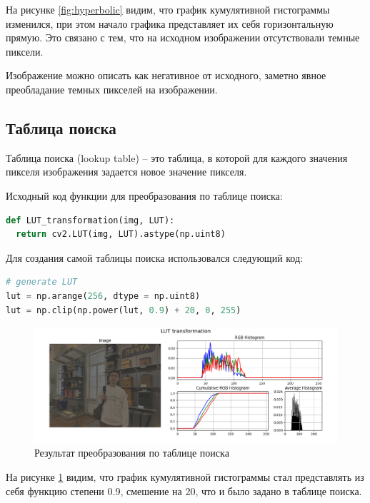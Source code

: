 На рисунке \ref{fig:hyperbolic} видим, что график кумулятивной гистограммы изменился, при этом начало графика представляет их себя горизонтальную
прямую. Это связано с тем, что на исходном изображении отсутствовали темные пиксели. 

Изображение можно описать как негативное от исходного, заметно явное преобладание темных пикселей на изображении.

\subsection{Таблица поиска}

Таблица поиска (lookup table) -- это таблица, в которой для каждого значения пикселя изображения задается новое значение пикселя.

Исходный код функции для преобразования по таблице поиска:

\begin{lstlisting}[language=Python]
def LUT_transformation(img, LUT):
  return cv2.LUT(img, LUT).astype(np.uint8)
\end{lstlisting}

Для создания самой таблицы поиска использовался следующий код:  

\begin{lstlisting}[language=Python]
# generate LUT 
lut = np.arange(256, dtype = np.uint8)
lut = np.clip(np.power(lut, 0.9) + 20, 0, 255)
\end{lstlisting}

\begin{figure}[H]
    \centering
    \includegraphics[width=\textwidth]{../results/LUT transformation.png}
    \caption{Результат преобразования по таблице поиска}
    \label{fig:lut}
\end{figure}

На рисунке \ref{fig:lut} видим, что график кумулятивной гистограммы стал представлять из себя функцию степени 0.9, смешение на 20, что и было задано в таблице поиска.  

